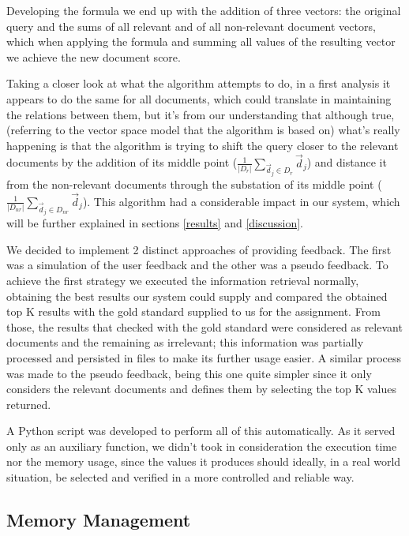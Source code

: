 \documentclass[12pt]{article}
\begin{document}
Developing the formula we end up with the addition of three vectors: 
the original query and the sums of all relevant and of all non-relevant document 
vectors, which when applying the formula and summing all values of the resulting 
vector we achieve the new document score.

\newpage
Taking a closer look at what the algorithm attempts to do, in a first analysis 
it appears to do the same for all documents, which could translate in maintaining 
the relations between them, but it's from our understanding that although true, 
(referring to the vector space model that the algorithm is based on) what's 
really happening is that the algorithm is trying to shift the query closer to 
the relevant documents by the addition of its middle point 
($\frac{1}{|D_{r}|} \sum_{ \vec{d}_{j} \in D_{r}} \vec{d}_{j}$) and distance it 
from the non-relevant documents through the substation of its middle point 
($\frac{1}{|D_{nr}|} \sum_{ \vec{d}_{j} \in D_{nr}} \vec{d}_{j}$).
This algorithm had a considerable impact in our system, which will be further 
explained in sections \ref{results} and \ref{discussion}.

We decided to implement 2 distinct approaches of providing feedback.
The first was a simulation of the user feedback and the other was a pseudo feedback. 
To achieve the first strategy we executed the information retrieval normally, 
obtaining the best results our system could supply and compared the obtained 
top K results with the gold standard supplied to us for the assignment. 
From those, the results that checked with the gold standard were considered as 
relevant documents and the remaining as irrelevant; 
this information was partially processed and persisted in files to make its 
further usage easier. 
A similar process was made to the pseudo feedback, being this one quite simpler 
since it only considers the relevant documents and defines them by selecting the 
top K values returned.

A Python script was developed to perform all of this automatically.
As it served only as an auxiliary function, we didn't took in consideration the 
execution time nor the memory usage, since the values it produces should ideally, 
in a real world situation, be selected and verified in a more controlled and reliable way.

\subsection{Memory Management} \label{memory}
\end{document}
